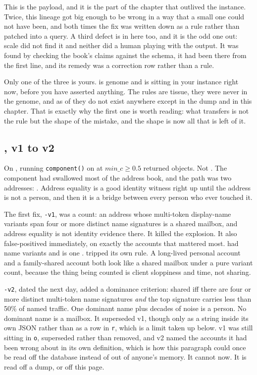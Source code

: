 This is the payload, and it is the part of the chapter that outlived the instance. Twice, this lineage got big enough to be wrong in a way that a small one could not have been, and both times the fix was written down as a rule rather than patched into a query. A third defect is in here too, and it is the odd one out: scale did not find it and neither did a human playing with the output. It was found by checking the book's claims against the schema, it had been there from the first line, and its remedy was a correction row rather than a rule.

Only one of the three is yours.  is genome and is sitting in your instance right now, before you have asserted anything. The \labLineageTissueRuleName{} rules are tissue, they were never in the genome, and as of \labLineageWipeDate{} they do not exist anywhere except in the dump and in this chapter. That is exactly why the first one is worth reading: what transfers is not the rule but the shape of the mistake, and the shape is now all that is left of it.

\subsection{\labLineageTissueRuleName{}, v1 to v2}

On \labLineageMailboxDate{}, running \texttt{component()} on \labColleagueAddr{} at $min\_c \geq 0.5$ returned \labLineageMailboxBlowup{} objects. Not \labLineageComponentTotal{}. The component had swallowed most of the address book, and the path was two addresses: \labLineageSharedMailboxPath{}. Address equality is a good identity witness right up until the address is not a person, and then it is a bridge between every person who ever touched it.

The first fix, \texttt{\labLineageTissueRuleName{}-v1}, was a count: an address whose multi-token display-name variants span four or more distinct name signatures is a shared mailbox, and address equality is not identity evidence there. It killed the explosion. It also false-positived immediately, on exactly the accounts that mattered most. \labColleagueAddr{} had \labLineageSeatCount{} name variants and is one \labColleagueNoun{}. \labOwnerAddr{} tripped its own rule. A long-lived personal account and a family-shared account both look like a shared mailbox under a pure variant count, because the thing being counted is client sloppiness and time, not sharing.

\texttt{\labLineageTissueRuleName{}-v2}, dated the next day, added a dominance criterion: shared iff there are four or more distinct multi-token name signatures \emph{and} the top signature carries less than 50\% of named traffic. One dominant name plus decades of noise is a person. No dominant name is a mailbox. It superseded v1, though only as a string inside its own JSON rather than as a row in \texttt{r}, which is a limit taken up below. v1 was still sitting in \texttt{o}, superseded rather than removed, and v2 named the accounts it had been wrong about in its own definition, which is how this paragraph could once be read off the database instead of out of anyone's memory. It cannot now. It is read off a dump, or off this page.

